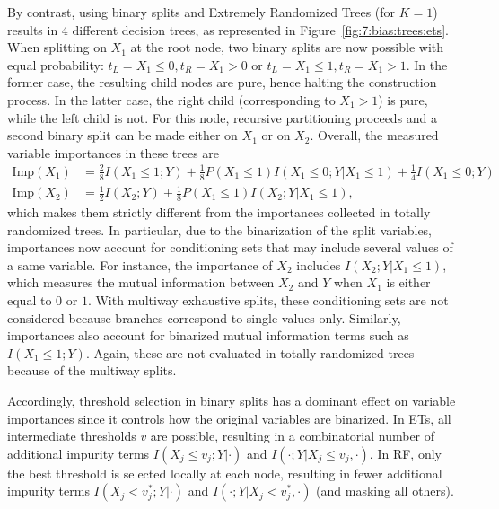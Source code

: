 By contrast, using binary splits and Extremely Randomized Trees (for $K=1$) results in $4$ different decision trees, as
represented in Figure~\ref{fig:7:bias:trees:ets}. When splitting on $X_1$ at
the root node, two binary splits are now possible with equal probability: $t_L = X_1 \leq 0, t_R = X_1 > 0$ or
$t_L = X_1 \leq 1, t_R = X_1 > 1$. In the former case, the resulting child nodes are pure,
hence halting the construction process. In the latter case, the right child
(corresponding to $X_1 > 1$) is pure, while the left child is not. For this
node, recursive partitioning proceeds and a second binary split can be made either on
$X_1$ or on $X_2$.  Overall, the measured variable
importances in these trees are
\begin{align*}
\text{Imp}(X_1) &= \frac{2}{8} I(X_1 \leq 1;Y) + \frac{1}{8} P(X_1 \leq 1) I(X_1 \leq 0;Y|X_1 \leq 1) + \frac{1}{4} I(X_1 \leq 0;Y)\\
\text{Imp}(X_2) &= \frac{1}{2} I(X_2;Y) + \frac{1}{8} P(X_1 \leq 1) I(X_2;Y|X_1\leq 1),
\end{align*}
which makes them strictly different from the importances collected in totally
randomized trees. In particular, due to the binarization of the split
variables, importances now account for conditioning sets that may include
several values of a same variable. For instance, the importance of $X_2$
includes $I(X_2;Y|X_1\leq 1)$, which measures the mutual information between
$X_2$ and $Y$ when $X_1$ is either equal to $0$ or $1$. With multiway
exhaustive splits, these conditioning sets are not considered because branches
correspond to single values only. Similarly, importances also account for
binarized mutual information terms such as $I(X_1 \leq 1;Y)$. Again, these are
not evaluated in totally randomized trees because of the multiway splits.

Accordingly, threshold selection in binary splits has a dominant effect on
variable importances since it controls how the original variables are
binarized. In ETs, all intermediate thresholds $v$ are possible, resulting in a
combinatorial number of additional impurity terms $I(X_j \leq v_j;Y|\cdot)$ and
$I(\cdot;Y|X_j \leq v_j, \cdot)$. In RF, only the best threshold is selected
locally at each node, resulting in fewer additional impurity terms $I(X_j <
v_j^*;Y|\cdot)$ and $I(\cdot;Y|X_j < v_j^*,\cdot)$ (and masking all others).

